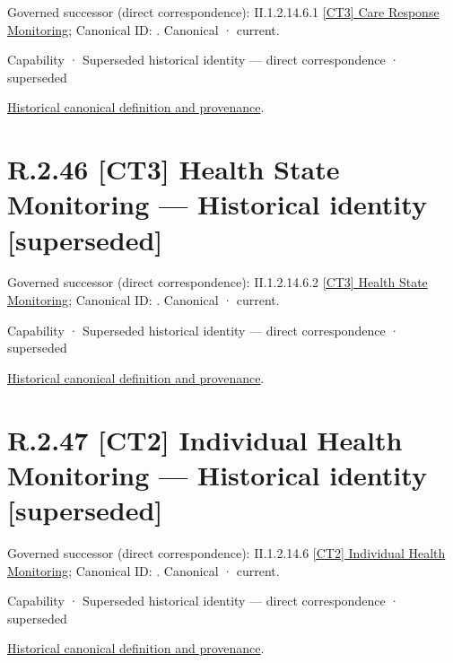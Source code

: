 {\small Governed successor (direct correspondence): II.1.2.14.6.1 \hyperref[element:d6951c9357fa40a4943cde581d95d5b1]{[CT3] Care Response Monitoring}; Canonical ID: \texttt{}. Canonical · current.}\par
\label{element:615f93d05fbb4a8481f07778bd4f4803}
{\small Capability · Superseded historical identity — direct correspondence · superseded}\par
\href{../../../../continuum/strategy/capability/615f93d05fbb4a8481f07778bd4f4803.md}{Historical canonical definition and provenance}.\par
\section*{R.2.46 [CT3] Health State Monitoring — Historical identity [superseded]}
\label{navigation:R.2.46}

{\small Governed successor (direct correspondence): II.1.2.14.6.2 \hyperref[element:d77f22909f8b47dba4cbd95982e576df]{[CT3] Health State Monitoring}; Canonical ID: \texttt{}. Canonical · current.}\par
\label{element:346f024f74b447a8b6056b9d521837ff}
{\small Capability · Superseded historical identity — direct correspondence · superseded}\par
\href{../../../../continuum/strategy/capability/346f024f74b447a8b6056b9d521837ff.md}{Historical canonical definition and provenance}.\par
\section*{R.2.47 [CT2] Individual Health Monitoring — Historical identity [superseded]}
\label{navigation:R.2.47}

{\small Governed successor (direct correspondence): II.1.2.14.6 \hyperref[element:c7d0e498e1ad44138df940af2f91cd2d]{[CT2] Individual Health Monitoring}; Canonical ID: \texttt{}. Canonical · current.}\par
\label{element:31e7c27556314cafb74d040441d2dac6}
{\small Capability · Superseded historical identity — direct correspondence · superseded}\par
\href{../../../../continuum/strategy/capability/31e7c27556314cafb74d040441d2dac6.md}{Historical canonical definition and provenance}.\par
